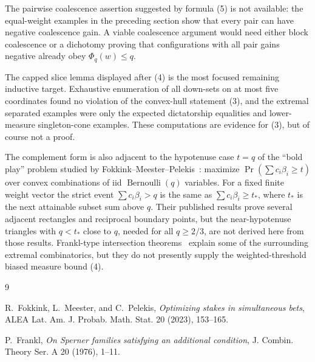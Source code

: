 \documentclass[12pt]{article}
\newcommand{\Ber}{\operatorname{Bernoulli}}
\begin{document}
The pairwise coalescence assertion suggested by formula (5) is not available:
the equal-weight examples in the preceding section show that every pair can have
negative coalescence gain.  A viable coalescence argument would need either block
coalescence or a dichotomy proving that configurations with all pair gains
negative already obey \(\Phi_q(w)\le q\).

The capped slice lemma displayed after (4) is the most focused remaining
inductive target.  Exhaustive enumeration of all down-sets on at most five
coordinates found no violation of the convex-hull statement (3), and the
extremal separated examples were only the expected dictatorship equalities and
lower-measure singleton-cone examples.  These computations are evidence for
(3), but of course not a proof.

The complement form is also adjacent to the hypotenuse case \(t=q\) of the
``bold play'' problem studied by Fokkink--Meester--Pelekis~\cite{FMP}: maximize
\(\Pr(\sum c_i\beta_i\ge t)\) over convex combinations of iid
\(\Ber(q)\) variables.  For a fixed finite weight vector the strict event
\(\sum c_i\beta_i>q\) is the same as \(\sum c_i\beta_i\ge t_*\), where
\(t_*\) is the next attainable subset sum above \(q\).  Their published
results prove several adjacent rectangles and reciprocal boundary points, but
the near-hypotenuse triangles with \(q<t_*\) close to \(q\), needed for all
\(q\ge2/3\), are not derived here from those results.  Frankl-type
intersection theorems~\cite{Frankl} explain some of the surrounding extremal
combinatorics, but they do not presently supply the weighted-threshold biased
measure bound (4).

\begin{thebibliography}{9}

R.~Fokkink, L.~Meester, and C.~Pelekis,
\emph{Optimizing stakes in simultaneous bets},
ALEA Lat. Am. J. Probab. Math. Stat. 20 (2023), 153--165.

P.~Frankl,
\emph{On Sperner families satisfying an additional condition},
J. Combin. Theory Ser. A 20 (1976), 1--11.

\end{thebibliography}
\end{document}

